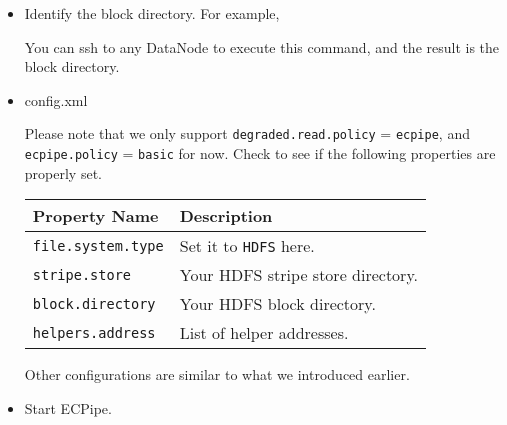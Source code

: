 \documentclass[letterpaper,12pt]{article}
\begin{document}
\begin{itemize}

\item Identify the block directory.  For example,

\noindent{}

You can ssh to any DataNode to execute this command, and the result is the
block directory.

\item config.xml

Please note that we only support {\tt degraded.read.policy} = {\tt ecpipe},
and {\tt ecpipe.policy} = {\tt basic} for now.  Check
 to see if the following properties are properly
set.


\begin{tabular}{|l|l|}
\hline
{\bf Property Name} & {\bf Description }\\
\hline
{\tt file.system.type} & Set it to {\tt HDFS} here. \\
\hline
{\tt stripe.store} & Your HDFS stripe store directory. \\
\hline
{\tt block.directory} & Your HDFS block directory. \\
\hline
{\tt helpers.address} &  List of helper addresses. \\
\hline
\end{tabular}

Other configurations are similar to what we introduced earlier.

\item Start ECPipe.

\begin{center}
\noindent{}
\end{center}

\end{itemize}
\end{document}

